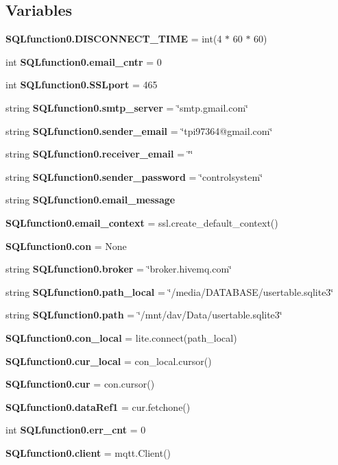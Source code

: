 \subsection*{Variables}
\begin{DoxyCompactItemize}
\item 
\textbf{ S\+Q\+Lfunction0.\+D\+I\+S\+C\+O\+N\+N\+E\+C\+T\+\_\+\+T\+I\+ME} = int(4 $\ast$ 60 $\ast$ 60)
\item 
int \textbf{ S\+Q\+Lfunction0.\+email\+\_\+cntr} = 0
\item 
int \textbf{ S\+Q\+Lfunction0.\+S\+S\+Lport} = 465
\item 
string \textbf{ S\+Q\+Lfunction0.\+smtp\+\_\+server} = \char`\"{}smtp.\+gmail.\+com\char`\"{}
\item 
string \textbf{ S\+Q\+Lfunction0.\+sender\+\_\+email} = \char`\"{}tpi97364@gmail.\+com\char`\"{}
\item 
string \textbf{ S\+Q\+Lfunction0.\+receiver\+\_\+email} = \char`\"{}\char`\"{}
\item 
string \textbf{ S\+Q\+Lfunction0.\+sender\+\_\+password} = \char`\"{}controlsystem\char`\"{}
\item 
string \textbf{ S\+Q\+Lfunction0.\+email\+\_\+message}
\item 
\textbf{ S\+Q\+Lfunction0.\+email\+\_\+context} = ssl.\+create\+\_\+default\+\_\+context()
\item 
\textbf{ S\+Q\+Lfunction0.\+con} = None
\item 
string \textbf{ S\+Q\+Lfunction0.\+broker} = \char`\"{}broker.\+hivemq.\+com\char`\"{}
\item 
string \textbf{ S\+Q\+Lfunction0.\+path\+\_\+local} = \char`\"{}/media/D\+A\+T\+A\+B\+A\+SE/usertable.\+sqlite3\char`\"{}
\item 
string \textbf{ S\+Q\+Lfunction0.\+path} = \char`\"{}/mnt/dav/Data/usertable.\+sqlite3\char`\"{}
\item 
\textbf{ S\+Q\+Lfunction0.\+con\+\_\+local} = lite.\+connect(path\+\_\+local)
\item 
\textbf{ S\+Q\+Lfunction0.\+cur\+\_\+local} = con\+\_\+local.\+cursor()
\item 
\textbf{ S\+Q\+Lfunction0.\+cur} = con.\+cursor()
\item 
\textbf{ S\+Q\+Lfunction0.\+data\+Ref1} = cur.\+fetchone()
\item 
int \textbf{ S\+Q\+Lfunction0.\+err\+\_\+cnt} = 0
\item 
\textbf{ S\+Q\+Lfunction0.\+client} = mqtt.\+Client()
\item 

\end{DoxyCompactItemize}
